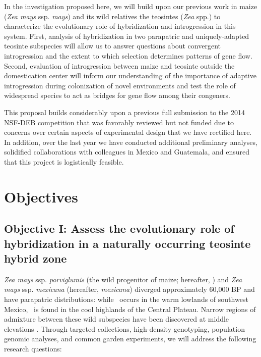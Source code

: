 In the investigation proposed here, we will build upon our previous work in maize (\emph{Zea mays} ssp. \emph{mays}) and its wild relatives the teosintes (\emph{Zea} spp.) to characterize the evolutionary role of hybridization and introgression in this system. 
First, analysis of hybridization in two parapatric and uniquely-adapted teosinte subspecies will allow us to answer questions about convergent introgression and the extent to which selection determines patterns of gene flow.
Second, evaluation of introgression between maize and teosinte outside the domestication center will inform our understanding of the importance of adaptive introgression during colonization of novel environments and test the role of widespread species to act as bridges for gene flow among their congeners.

This proposal builds considerably upon a previous full submission to the 2014 NSF-DEB competition that was favorably reviewed but not funded due to concerns over certain aspects of experimental design that we have rectified here.
In addition, over the last year we have conducted additional preliminary analyses, solidified collaborations with colleagues in Mexico and Guatemala, and ensured that this project is logistically feasible.

\section*{Objectives}
\subsection*{Objective I: Assess the evolutionary role of hybridization in a naturally occurring teosinte hybrid zone}
\emph{Zea mays} ssp. \emph{parviglumis} (the wild progenitor of maize; hereafter, \zp) and \emph{Zea mays} ssp. \emph{mexicana} (hereafter, \emph{mexicana}) diverged approximately 60,000 BP \citep{Ross-Ibarra2009a} and have parapatric distributions: while \zp\ occurs in the warm lowlands of southwest Mexico, \zm\  is found in the cool highlands of the Central Plateau. 
Narrow regions of admixture between these wild subspecies have been discovered at middle elevations \citep{Fukunaga2005, Pyhajarvi2013}. 
Through targeted collections, high-density genotyping, population genomic analyses, and common garden experiments, we will address the following research questions: 

